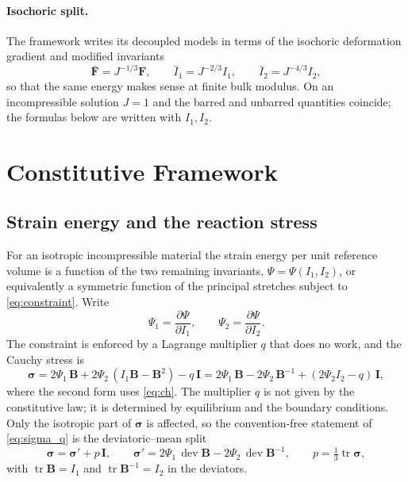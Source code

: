 \documentclass[11pt]{article}
\newcommand{\dev}{\operatorname{dev}}
\newcommand{\tr}{\operatorname{tr}}
\newcommand{\bsig}{\bm{\sigma}}
\newcommand{\bF}{\bm{F}}
\newcommand{\bFb}{\bar{\bm{F}}}
\newcommand{\bB}{\bm{B}}
\newcommand{\bI}{\bm{I}}
\newcommand{\Ione}{I_1}
\newcommand{\Itwo}{I_2}
\newcommand{\Ib}{\bar{I}_1}
\newcommand{\IIb}{\bar{I}_2}
\newcommand{\Pone}{\Psi_{1}}
\newcommand{\Ptwo}{\Psi_{2}}
\begin{document}
\paragraph{Isochoric split.}
The framework writes its decoupled models in terms of the isochoric
deformation gradient and modified invariants
\begin{equation}
  \bFb = J^{-1/3}\bF, \qquad \Ib = J^{-2/3}\Ione, \qquad \IIb = J^{-4/3}\Itwo,
\end{equation}
so that the same energy makes sense at finite bulk modulus.  On an
incompressible solution $J = 1$ and the barred and unbarred quantities
coincide; the formulas below are written with $\Ione, \Itwo$.

\section{Constitutive Framework}

\subsection{Strain energy and the reaction stress}

For an isotropic incompressible material the strain energy per unit
reference volume is a function of the two remaining invariants,
$\Psi = \Psi(\Ione,\Itwo)$, or equivalently a symmetric function of the
principal stretches subject to \eqref{eq:constraint}.  Write
\begin{equation}
  \Pone = \frac{\partial\Psi}{\partial\Ione}, \qquad
  \Ptwo = \frac{\partial\Psi}{\partial\Itwo}.
\end{equation}
The constraint is enforced by a Lagrange multiplier $q$ that does no work,
and the Cauchy stress is
\begin{equation}
  \bsig = 2\Pone\,\bB + 2\Ptwo\,(\Ione\bB - \bB^2) - q\,\bI
        = 2\Pone\,\bB - 2\Ptwo\,\bB^{-1} + (2\Ptwo\Itwo - q)\,\bI ,
  \label{eq:sigma_q}
\end{equation}
where the second form uses \eqref{eq:ch}.  The multiplier $q$ is not given
by the constitutive law; it is determined by equilibrium and the boundary
conditions.  Only the isotropic part of $\bsig$ is affected, so the
convention-free statement of \eqref{eq:sigma_q} is the deviatoric--mean
split
\begin{equation}
  \boxed{\;
  \bsig = \bsig' + p\,\bI, \qquad
  \bsig' = 2\Pone\,\dev\bB - 2\Ptwo\,\dev\bB^{-1}, \qquad
  p = \tfrac13\tr\bsig ,\;}
  \label{eq:sigma_split}
\end{equation}
with $\tr\bB = \Ione$ and $\tr\bB^{-1} = \Itwo$ in the deviators.
\end{document}

